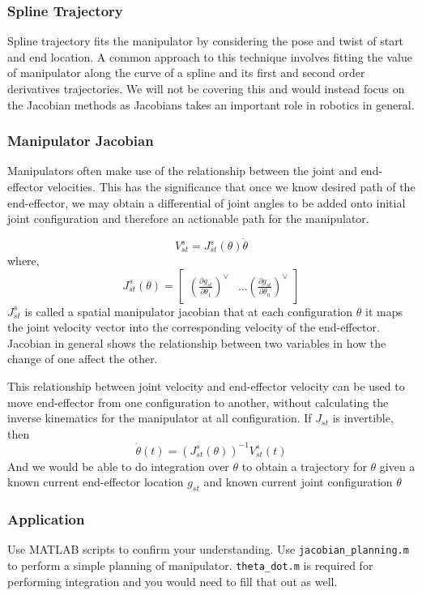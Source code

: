 \documentclass[letterpaper]{article}
\begin{document}
\subsubsection{Spline Trajectory}
Spline trajectory fits the manipulator by considering the pose and twist of start
and end location. A common approach to this technique involves fitting the value of manipulator
along the curve of a spline and its first and second order derivatives trajectories. We will not be covering
this and would instead focus on the Jacobian methods as Jacobians takes an important role in robotics in
general. 

\subsubsection{Manipulator Jacobian}
Manipulators often make use of the relationship between the joint and end-effector
velocities. This has the significance that once we know desired path of the 
end-effector, we may obtain a differential of joint angles to be added onto
initial joint configuration and therefore an actionable path for the manipulator.

\begin{equation*}
  V^{s}_{st} = J^{s}_{st}(\theta)\dot{\theta}
\end{equation*}
where,
\begin{equation*}
  J^s_{st}(\theta) = \begin{bmatrix}
    \left(\frac{\partial g_{st}}{\partial \theta_1}\right)^\vee & \dots
    \left(\frac{\partial g_{st}}{\partial \theta_n}\right)^\vee
  \end{bmatrix}
\end{equation*}
$J^s_{st}$ is called a spatial manipulator jacobian that at each configuration $\theta$
it maps the joint velocity vector into the corresponding velocity of the
end-effector. Jacobian in general shows the relationship between two variables in how
the change of one affect the other.

This relationship between joint velocity and end-effector velocity can be used
to move end-effector from one configuration to another, without calculating the
inverse kinematics for the manipulator at all configuration. If $J_{st}$ is invertible,
then
\begin{equation*}
  \dot{\theta}(t) = \left(J^{s}_{st}(\theta)\right)^{-1}V^{s}_{st}(t)
\end{equation*}
And we would be able to do integration over $\theta$ to obtain a trajectory for 
$\theta$ given a known current end-effector location $g_{st}$ and known
current joint configuration $\theta$

\subsubsection{Application}
Use MATLAB scripts to confirm your understanding. Use \texttt{jacobian\_planning.m}
to perform a simple planning of manipulator. \texttt{theta\_dot.m} is required for performing integration
and you would need to fill that out as well.
\end{document}
